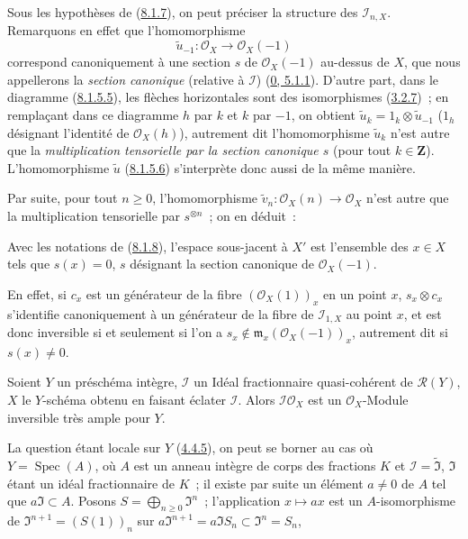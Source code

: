 \begin{env}[8.1.9]
\label{II.8.1.9-fr}
Sous les hypothèses de (\hyperref[II.8.1.7-fr]{8.1.7}), on peut préciser la
structure des $\mathcal{I}_{n,X}$. Remarquons en effet que l'homomorphisme
\[
  \widetilde{u}_{-1}:\mathcal{O}_X\to\mathcal{O}_X(-1)
\]
correspond canoniquement à une section $s$ de $\mathcal{O}_X(-1)$ au-dessus de
$X$, que nous appellerons la \emph{section canonique} (relative à
$\mathcal{I}$) (\hyperref[0.5.1.1-fr]{0, 5.1.1}). D'autre part, dans le
diagramme (\hyperref[II.8.1.5.5-fr]{8.1.5.5}), les flèches horizontales sont
des isomorphismes (\hyperref[II.3.2.7-fr]{3.2.7})~; en remplaçant dans ce
diagramme $h$ par $k$ et $k$ par $-1$, on obtient
$\widetilde{u}_k=1_k\otimes\widetilde{u}_{-1}$ ($1_h$ désignant l'identité de
$\mathcal{O}_X(h)$), autrement dit l'homomorphisme $\widetilde{u}_k$ n'est
autre que la \emph{multiplication tensorielle par la section canonique $s$}
(pour tout $k\in\mathbf{Z}$). L'homomorphisme $\widetilde{u}$
(\hyperref[II.8.1.5.6-fr]{8.1.5.6}) s'interprète donc aussi de la même manière.

Par suite, pour tout $n\geq0$, l'homomorphisme
$\widetilde{v}_n:\mathcal{O}_X(n)\to\mathcal{O}_X$ n'est autre que la
multiplication tensorielle par $s^{\otimes n}$~; on en déduit~:
\end{env}

\begin{corollary}[8.1.10]
\label{II.8.1.10-fr}
Avec les notations de (\hyperref[II.8.1.8-fr]{8.1.8}), l'espace sous-jacent à
$X'$ est l'ensemble des $x\in X$ tels que $s(x)=0$, $s$ désignant la section
canonique de $\mathcal{O}_X(-1)$.
\end{corollary}

En effet, si $c_x$ est un générateur de la fibre $(\mathcal{O}_X(1))_x$ en un
point $x$, $s_x\otimes c_x$ s'identifie canoniquement à un générateur de la
fibre de $\mathcal{I}_{1,X}$ au point $x$, et est donc inversible si et
seulement si l'on a
$s_x\notin\mathfrak{m}_x(\mathcal{O}_X(-1))_x$, autrement dit si
$s(x)\neq0$.

\begin{proposition}[8.1.11]
\label{II.8.1.11-fr}
Soient $Y$ un préschéma intègre, $\mathcal{I}$ un Idéal fractionnaire
quasi-cohérent de $\mathcal{R}(Y)$, $X$ le $Y$-schéma obtenu en faisant éclater
$\mathcal{I}$. Alors $\mathcal{I}\mathcal{O}_X$ est un
$\mathcal{O}_X$-Module inversible très ample pour $Y$.
\end{proposition}

La question étant locale sur $Y$ (\hyperref[II.4.4.5-fr]{4.4.5}), on peut se
borner au cas où $Y=\operatorname{Spec}(A)$, où $A$ est un anneau intègre de
corps des fractions $K$ et $\mathcal{I}=\widetilde{\mathfrak{I}}$,
$\mathfrak{I}$ étant un idéal fractionnaire de $K$~; il existe par suite un
élément $a\neq0$ de $A$ tel que $a\mathfrak{I}\subset A$. Posons
$S=\bigoplus_{n\geq0}\mathfrak{I}^n$~; l'application $x\mapsto ax$ est un
$A$-isomorphisme de $\mathfrak{I}^{n+1}=(S(1))_n$ sur
$a\mathfrak{I}^{n+1}=a\mathfrak{I}S_n\subset\mathfrak{I}^n=S_n$,

